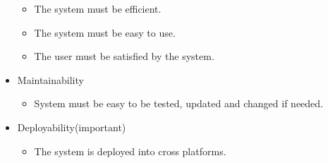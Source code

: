 \documentclass[a4paper,12pt]{article}
\begin{document}
\begin{itemize}
		\begin{itemize}
			\item The system must be efficient.
			\item The system must be easy to use.
			\item The user must be satisfied by the system.
		\end{itemize}
	\item Maintainability
		\begin{itemize}
			\item System must be easy to be tested, updated and changed if needed.
		\end{itemize}
	\item Deployability(important)
		\begin{itemize}
			\item The system is deployed into cross platforms.
		\end{itemize}
	\end{itemize}
\end{document}
